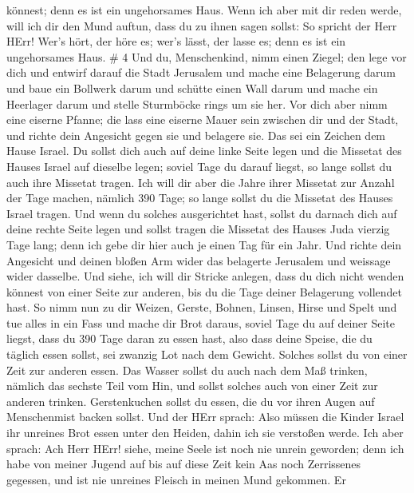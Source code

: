 könnest; denn es ist ein ungehorsames Haus.  Wenn ich aber
mit dir reden werde, will ich dir den Mund auftun, dass du zu ihnen
sagen sollst: So spricht der Herr HErr! Wer's hört, der höre es; wer's
lässt, der lasse es; denn es ist ein ungehorsames Haus. \# 4
 Und du, Menschenkind, nimm einen Ziegel; den lege vor dich
und entwirf darauf die Stadt Jerusalem  und mache eine
Belagerung darum und baue ein Bollwerk darum und schütte einen Wall
darum und mache ein Heerlager darum und stelle Sturmböcke rings um sie
her.  Vor dich aber nimm eine eiserne Pfanne; die lass eine
eiserne Mauer sein zwischen dir und der Stadt, und richte dein Angesicht
gegen sie und belagere sie. Das sei ein Zeichen dem Hause Israel.
 Du sollst dich auch auf deine linke Seite legen und die
Missetat des Hauses Israel auf dieselbe legen; soviel Tage du darauf
liegst, so lange sollst du auch ihre Missetat tragen.  Ich
will dir aber die Jahre ihrer Missetat zur Anzahl der Tage machen,
nämlich 390 Tage; so lange sollst du die Missetat des Hauses Israel
tragen.  Und wenn du solches ausgerichtet hast, sollst du
darnach dich auf deine rechte Seite legen und sollst tragen die Missetat
des Hauses Juda vierzig Tage lang; denn ich gebe dir hier auch je einen
Tag für ein Jahr.  Und richte dein Angesicht und deinen
bloßen Arm wider das belagerte Jerusalem und weissage wider dasselbe.
 Und siehe, ich will dir Stricke anlegen, dass du dich nicht
wenden könnest von einer Seite zur anderen, bis du die Tage deiner
Belagerung vollendet hast.  So nimm nun zu dir Weizen,
Gerste, Bohnen, Linsen, Hirse und Spelt und tue alles in ein Fass und
mache dir Brot daraus, soviel Tage du auf deiner Seite liegst, dass du
390 Tage daran zu essen hast,  also dass deine Speise, die
du täglich essen sollst, sei zwanzig Lot nach dem Gewicht. Solches
sollst du von einer Zeit zur anderen essen.  Das Wasser
sollst du auch nach dem Maß trinken, nämlich das sechste Teil vom Hin,
und sollst solches auch von einer Zeit zur anderen trinken.
 Gerstenkuchen sollst du essen, die du vor ihren Augen auf
Menschenmist backen sollst.  Und der HErr sprach: Also
müssen die Kinder Israel ihr unreines Brot essen unter den Heiden, dahin
ich sie verstoßen werde.  Ich aber sprach: Ach Herr HErr!
siehe, meine Seele ist noch nie unrein geworden; denn ich habe von
meiner Jugend auf bis auf diese Zeit kein Aas noch Zerrissenes gegessen,
und ist nie unreines Fleisch in meinen Mund gekommen.  Er
